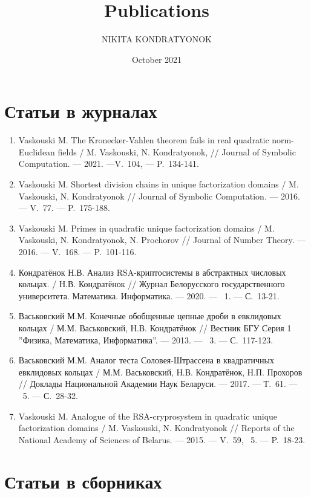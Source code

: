 \documentclass{article}
\title{Publications}
\author{NIKITA KONDRATYONOK}
\date{October 2021}
\begin{document}
\section{Статьи в журналах}

\begin{enumerate}
    \item Vaskouski M. The Kronecker-Vahlen theorem fails in real quadratic norm-Euclidean fields / M. Vaskouski, N. Kondratyonok, // Journal of Symbolic Computation. --- 2021. ---V.~104, --- P.~134-141.

    \item Vaskouski M. Shortest division chains in unique factorization domains / M. Vaskouski, N. Kondratyonok // Journal of Symbolic Computation. --- 2016. --- V.~77. --- P.~175-188.

    \item Vaskouski M. Primes in quadratic unique factorization domains / M. Vaskouski, N. Kondratyonok, N. Prochorov // Journal of Number Theory. --- 2016. --- V.~168. --- P.~101-116.
    
    \item Кондратёнок Н.В. Анализ RSA-криптосистемы в абстрактных числовых кольцах. / Н.В. Кондратёнок // Журнал Белорусского государственного университета. Математика. Информатика. --- 2020. --- \textnumero~1. --- С.~13-21.

    \item Васьковский М.М. Конечные обобщенные цепные дроби в евклидовых кольцах / М.М. Васьковский, Н.В. Кондратёнок // Вестник БГУ Серия 1 ''Физика, Математика, Информатика''. --- 2013. --- \textnumero~3. --- С.~117-123.

    \item Васьковский М.М. Аналог теста Соловея-Штрассена в квадратичных евклидовых кольцах / М.М. Васьковский, Н.В. Кондратёнок, Н.П. Прохоров // Доклады Национальной Академии Наук Беларуси. --- 2017. --- Т.~61. --- \textnumero~5. --- С.~28-32.

    \item Vaskouski M. Analogue of the RSA-cryprosystem in quadratic unique factorization domains / M. Vaskouski, N. Kondratyonok // Reports of the National Academy of Sciences of Belarus. --- 2015. --- V.~59, \textnumero~5. --- P.~18-23.
\end{enumerate}

\section{Статьи в сборниках}
\end{document}
